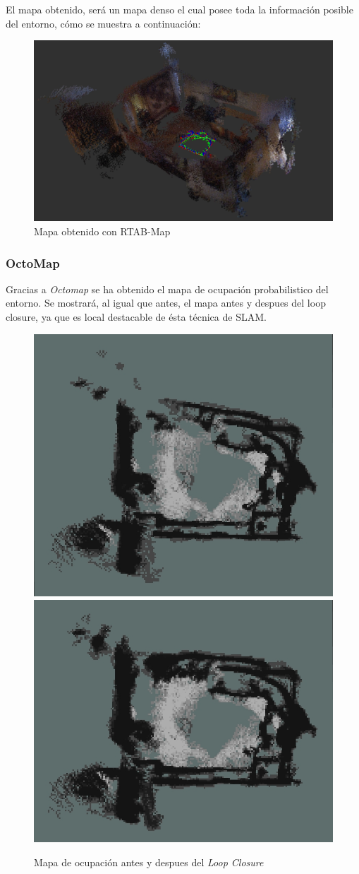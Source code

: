 El mapa obtenido, será un mapa denso el cual posee toda la información posible del entorno, cómo se muestra a continuación:
\begin{figure}[h!]
    \centering
    \includegraphics[width=.9\textwidth]{images/slam/bag1_rtabmapbonito}
    \caption{Mapa obtenido con RTAB-Map}
\end{figure}
\newpage
\subsubsection{OctoMap}
Gracias a \textit{Octomap} se ha obtenido el mapa de ocupación probabilistico del entorno. Se mostrará, al igual que antes, el mapa antes y despues del loop closure, ya que es local
destacable de ésta técnica de SLAM.
\begin{figure}[h!]
    \centering
    \includegraphics[width=.4\textwidth]{images/slam/bag1_occupGrid_noLC}
    \includegraphics[width=.435\textwidth]{images/slam/bag1_occupGrid_LC}
    \caption{Mapa de ocupación antes y despues del \textit{Loop Closure}}
\end{figure}

